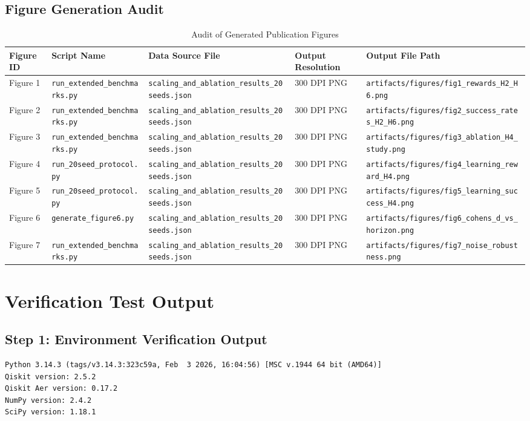 \documentclass[10pt,article]{article}
\begin{document}
\subsection{Figure Generation Audit}
\begin{table}[h!]
\centering
\caption{Audit of Generated Publication Figures}
\begin{tabular}{lllll}
\toprule
Figure ID & Script Name & Data Source File & Output Resolution & Output File Path \\
\midrule
Figure 1 & \texttt{run\_extended\_benchmarks.py} & \texttt{scaling\_and\_ablation\_results\_20seeds.json} & 300 DPI PNG & \texttt{artifacts/figures/fig1\_rewards\_H2\_H6.png} \\
Figure 2 & \texttt{run\_extended\_benchmarks.py} & \texttt{scaling\_and\_ablation\_results\_20seeds.json} & 300 DPI PNG & \texttt{artifacts/figures/fig2\_success\_rates\_H2\_H6.png} \\
Figure 3 & \texttt{run\_extended\_benchmarks.py} & \texttt{scaling\_and\_ablation\_results\_20seeds.json} & 300 DPI PNG & \texttt{artifacts/figures/fig3\_ablation\_H4\_study.png} \\
Figure 4 & \texttt{run\_20seed\_protocol.py} & \texttt{scaling\_and\_ablation\_results\_20seeds.json} & 300 DPI PNG & \texttt{artifacts/figures/fig4\_learning\_reward\_H4.png} \\
Figure 5 & \texttt{run\_20seed\_protocol.py} & \texttt{scaling\_and\_ablation\_results\_20seeds.json} & 300 DPI PNG & \texttt{artifacts/figures/fig5\_learning\_success\_H4.png} \\
Figure 6 & \texttt{generate\_figure6.py} & \texttt{scaling\_and\_ablation\_results\_20seeds.json} & 300 DPI PNG & \texttt{artifacts/figures/fig6\_cohens\_d\_vs\_horizon.png} \\
Figure 7 & \texttt{run\_extended\_benchmarks.py} & \texttt{scaling\_and\_ablation\_results\_20seeds.json} & 300 DPI PNG & \texttt{artifacts/figures/fig7\_noise\_robustness.png} \\
\bottomrule
\end{tabular}
\end{table}

\newpage
\section{Verification Test Output}

\subsection{Step 1: Environment Verification Output}
\begin{lstlisting}[caption={Python Environment Verification Output}]
Python 3.14.3 (tags/v3.14.3:323c59a, Feb  3 2026, 16:04:56) [MSC v.1944 64 bit (AMD64)]
Qiskit version: 2.5.2
Qiskit Aer version: 0.17.2
NumPy version: 2.4.2
SciPy version: 1.18.1
\end{lstlisting}
\end{document}
